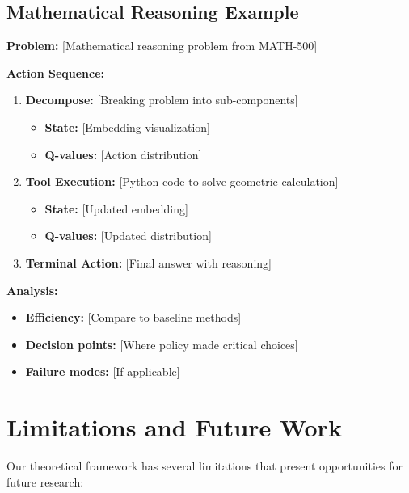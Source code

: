\documentclass[10pt,journal,compsoc]{IEEEtran}
\begin{document}
\subsection{Mathematical Reasoning Example}

\textbf{Problem:} [Mathematical reasoning problem from MATH-500]

\textbf{Action Sequence:}
\begin{enumerate}
\item \textbf{Decompose:} [Breaking problem into sub-components]
   \begin{itemize}
   \item \textbf{State:} [Embedding visualization]
   \item \textbf{Q-values:} [Action distribution]
   \end{itemize}
   
\item \textbf{Tool Execution:} [Python code to solve geometric calculation]
   \begin{itemize}
   \item \textbf{State:} [Updated embedding]
   \item \textbf{Q-values:} [Updated distribution]
   \end{itemize}
   
\item \textbf{Terminal Action:} [Final answer with reasoning]
\end{enumerate}

\textbf{Analysis:}
\begin{itemize}
\item \textbf{Efficiency:} [Compare to baseline methods]
\item \textbf{Decision points:} [Where policy made critical choices]
\item \textbf{Failure modes:} [If applicable]
\end{itemize}

\section{Limitations and Future Work}

Our theoretical framework has several limitations that present opportunities for future research:
\end{document}
